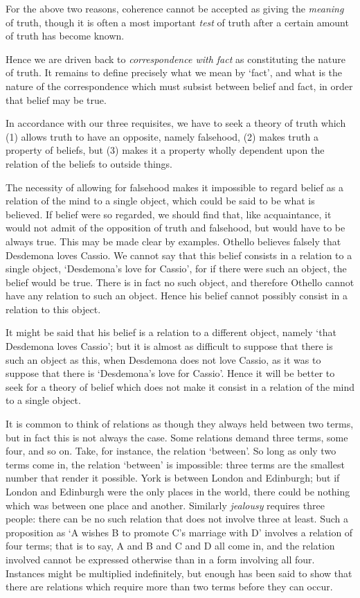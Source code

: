 \documentclass[oneside,letterpaper,12pt]{book}
\begin{document}
For the above two reasons, coherence cannot be accepted as giving the
\emph{meaning} of truth, though it is often a most important \emph{test}
of truth after a certain amount of truth has become known.

Hence we are driven back to \emph{correspondence with fact} as
constituting the nature of truth. It remains to define precisely what we
mean by `fact', and what is the nature of
the correspondence which must subsist between belief and fact, in order
that belief may be true.

In accordance with our three requisites, we have to seek a theory of
truth which (1) allows truth to have an opposite, namely falsehood, (2)
makes truth a property of beliefs, but (3) makes it a property wholly
dependent upon the relation of the beliefs to outside things.

The necessity of allowing for falsehood makes it impossible to regard
belief as a relation of the mind to a single object, which could be said
to be what is believed. \label{entities} If belief were so regarded, we should find that,
like acquaintance, it would not admit of the opposition of truth and
falsehood, but would have to be always true. This may be made clear by
examples. Othello believes falsely that Desdemona loves Cassio. We
cannot say that this belief consists in a relation to a single object,
`Desdemona's love for
Cassio', for if there were such an object, the belief
would be true. There is in fact no such object, and therefore Othello
cannot have any relation to such an object. Hence his belief cannot
possibly consist in a relation to this object.

It might be said that his belief is a relation to a different object,
namely `that Desdemona loves Cassio'; but
it is almost as difficult to suppose that there is such an object as
this, when Desdemona does not love Cassio, as it was to suppose that
there is `Desdemona's love for
Cassio'. Hence it will be better to seek for a theory of
belief which does not make it consist in a relation of the mind to a
single object.

It is common to think of relations as though they always held between
two terms, but in fact this is not always the case. Some relations
demand three terms, some four, and so on. Take, for instance, the
relation `between'. So long as only two
terms come in, the relation `between'
is impossible: three terms are the smallest number that render it
possible. York is between London and Edinburgh; but if London and
Edinburgh were the only places in the world, there could be nothing
which was between one place and another. Similarly \emph{jealousy}
requires three people: there can be no such relation that does not
involve three at least. Such a proposition as `A wishes
B to promote C's marriage with D'
involves a relation of four terms; that is to say, A and B and C and D
all come in, and the relation involved cannot be expressed otherwise
than in a form involving all four. Instances might be multiplied
indefinitely, but enough has been said to show that there are relations
which require more than two terms before they can occur.
\end{document}
